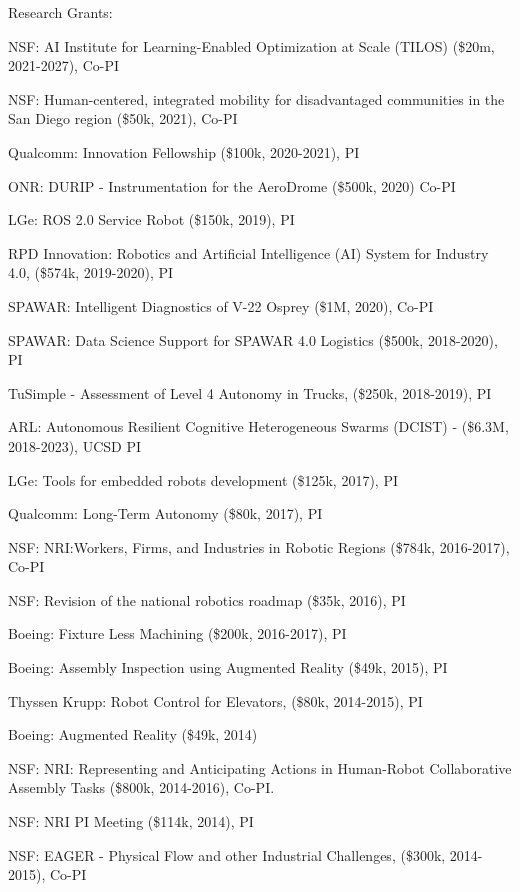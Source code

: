 \documentclass{article}
\begin{document}
\begin{cv}
\begin{cvlist}{Research Grants:}
\item NSF: AI Institute for Learning-Enabled Optimization at Scale (TILOS) (\$20m, 2021-2027), Co-PI
\item NSF: Human-centered, integrated mobility for disadvantaged
  communities in the San Diego region (\$50k, 2021), Co-PI
\item Qualcomm: Innovation Fellowship (\$100k, 2020-2021), PI
\item ONR: DURIP - Instrumentation for the AeroDrome (\$500k, 2020) Co-PI
\item LGe: ROS 2.0 Service Robot (\$150k, 2019), PI
\item RPD Innovation: Robotics and Artificial Intelligence (AI) System for 
  Industry 4.0, (\$574k, 2019-2020), PI 
\item SPAWAR: Intelligent Diagnostics of V-22 Osprey (\$1M, 2020), Co-PI
\item SPAWAR: Data Science Support for SPAWAR 4.0 Logistics (\$500k,
  2018-2020), PI
\item TuSimple - Assessment of Level 4 Autonomy in Trucks,  (\$250k,
  2018-2019), PI
\item ARL: Autonomous Resilient Cognitive Heterogeneous Swarms
  (DCIST) - (\$6.3M, 2018-2023), UCSD PI
\item LGe: Tools for embedded robots development (\$125k, 2017), PI
\item Qualcomm: Long-Term Autonomy (\$80k, 2017), PI
\item NSF: NRI:Workers, Firms, and Industries in Robotic Regions
  (\$784k, 2016-2017), Co-PI
\item NSF: Revision of the national robotics roadmap (\$35k, 2016), PI
\item Boeing: Fixture Less Machining (\$200k, 2016-2017), PI
\item Boeing: Assembly Inspection using Augmented Reality (\$49k,
  2015), PI
\item Thyssen Krupp: Robot Control for Elevators, (\$80k, 2014-2015), PI
\item Boeing: Augmented Reality (\$49k, 2014)
\item NSF: NRI: Representing and Anticipating Actions in Human-Robot
  Collaborative Assembly Tasks (\$800k, 2014-2016), Co-PI.
\item NSF: NRI PI Meeting (\$114k, 2014), PI
\item NSF: EAGER - Physical Flow and other Industrial Challenges,
  (\$300k, 2014-2015), Co-PI

\end{cvlist}
\end{cv}
\end{document}
